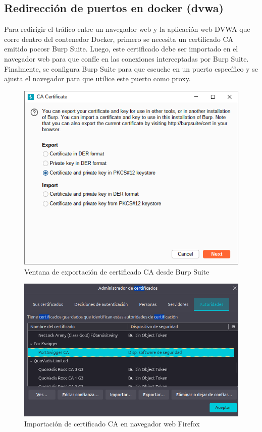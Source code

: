 \documentclass[letterpaper,12pt]{article}
\let\origsubsection\subsection
\renewcommand{\subsection}{\FloatBarrier\origsubsection}
\begin{document}
\subsection{Redirección de puertos en docker (dvwa)}
Para redirigir el tráfico entre un navegador web y la aplicación web DVWA que corre dentro del contenedor Docker, primero se necesita un certificado CA emitido pocosr Burp Suite. Luego, este certificado debe ser importado en el navegador web para que confíe en las conexiones interceptadas por Burp Suite. Finalmente, se configura Burp Suite para que escuche en un puerto específico y se ajusta el navegador para que utilice este puerto como proxy.
\begin{figure}
    \centering
    \includegraphics[width=1\linewidth]{levanteyredireccione/Captura desde 2025-10-01 22-50-08.png}
    \caption{Ventana de exportación de certificado CA desde Burp Suite}
    \label{fig:certificateburp}
\end{figure}
\begin{figure}
    \centering
    \includegraphics[width=1\linewidth]{levanteyredireccione/Captura desde 2025-10-01 22-52-57.png}
    \caption{Importación de certificado CA en navegador web Firefox}
    \label{fig:certificate}
\end{figure}
\end{document}
